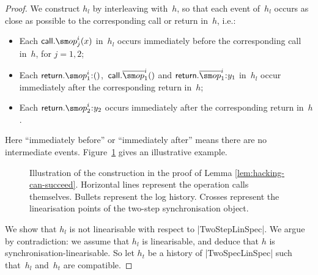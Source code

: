 \begin{proof}
We construct $h_l$ by interleaving with~$h$, so that each event of~$h_l$
occurs as close as possible to the corresponding call or return in~$h$, i.e.:
%
\begin{itemize}
\item Each $\call.\op_j^{i}(x)$ in~$h_l$ occurs immediately before the
  corresponding call in~$h$, for $j = 1,2$;

\item Each $\return.\op_1^i \:: ()$,\, $\call.\overline{\op}_1^i()$ and
  $\return.\overline{\op}_1^i \:: y_1$ in~$h_l$ occur immediately after the
  corresponding return in~$h$;

\item Each $\return.\op_2^i \:: y_2$ occurs immediately after the
  corresponding return in~$h$.
\end{itemize}
%
Here ``immediately before'' or ``immediately after'' means there are no
intermediate events.  Figure~\ref{fig:hacking-can-succeed} gives an
illustrative example. 


\begin{figure}[tp]
\begin{center}
\end{center}
\caption{Illustration of the construction in the proof of Lemma
  \ref{lem:hacking-can-succeed}.  Horizontal lines represent the operation
  calls themselves.  Bullets represent the log history.  Crosses represent
  the linearisation points of the two-step synchronisation object.}
\label{fig:hacking-can-succeed}
\end{figure}

We show that $h_l$ is not linearisable with respect to |TwoStepLinSpec|.  We
argue by contradiction: we assume that $h_l$ is linearisable, and deduce that
$h$ is synchronisation-linearisable.  So let $h_t$ be a history of
|TwoSpecLinSpec| such that~$h_l$ and~$h_t$ are compatible.  


\end{proof}
